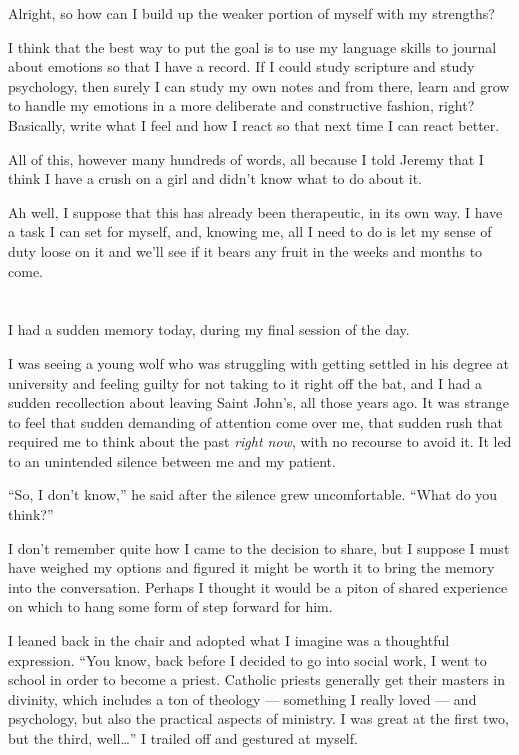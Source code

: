 Alright, so how can I build up the weaker portion of myself with my strengths?

I think that the best way to put the goal is to use my language skills to journal about emotions so that I have a record. If I could study scripture and study psychology, then surely I can study my own notes and from there, learn and grow to handle my emotions in a more deliberate and constructive fashion, right? Basically, write what I feel and how I react so that next time I can react better.

All of this, however many hundreds of words, all because I told Jeremy that I think I have a crush on a girl and didn't know what to do about it.

Ah well, I suppose that this has already been therapeutic, in its own way. I have a task I can set for myself, and, knowing me, all I need to do is let my sense of duty loose on it and we'll see if it bears any fruit in the weeks and months to come.

\section{}

I had a sudden memory today, during my final session of the day.

I was seeing a young wolf who was struggling with getting settled in his degree at university and feeling guilty for not taking to it right off the bat, and I had a sudden recollection about leaving Saint John's, all those years ago. It was strange to feel that sudden demanding of attention come over me, that sudden rush that required me to think about the past \emph{right now}, with no recourse to avoid it. It led to an unintended silence between me and my patient.

``So, I don't know,'' he said after the silence grew uncomfortable. ``What do you think?''

I don't remember quite how I came to the decision to share, but I suppose I must have weighed my options and figured it might be worth it to bring the memory into the conversation. Perhaps I thought it would be a piton of shared experience on which to hang some form of step forward for him.

I leaned back in the chair and adopted what I imagine was a thoughtful expression. ``You know, back before I decided to go into social work, I went to school in order to become a priest. Catholic priests generally get their masters in divinity, which includes a ton of theology --- something I really loved --- and psychology, but also the practical aspects of ministry. I was great at the first two, but the third, well\ldots{}'' I trailed off and gestured at myself.

